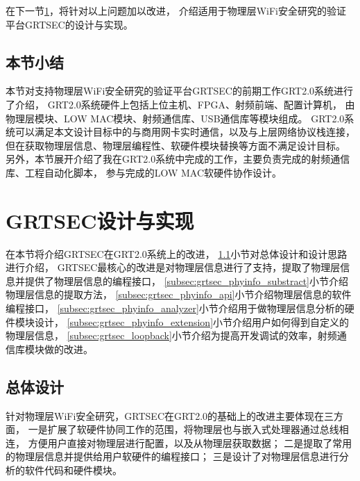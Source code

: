 		在下一节\ref{sec:grtsec_design}，将针对以上问题加以改进，
		介绍适用于物理层WiFi安全研究的验证平台GRTSEC的设计与实现。

		\subsection{本节小结}\label{subsec:grt2.0_summary}
		本节对支持物理层WiFi安全研究的验证平台GRTSEC的前期工作GRT2.0系统进行了介绍，
		GRT2.0系统硬件上包括上位主机、FPGA、射频前端、配置计算机，
		由物理层模块、LOW MAC模块、射频通信库、USB通信库等模块组成。
		GRT2.0系统可以满足本文设计目标中的与商用网卡实时通信，以及与上层网络协议栈连接，
		但在获取物理层信息、物理层编程性、软硬件模块替换等方面不满足设计目标。
		另外，本节展开介绍了我在GRT2.0系统中完成的工作，主要负责完成的射频通信库、工程自动化脚本，
		参与完成的LOW MAC软硬件协作设计。

	\section{GRTSEC设计与实现}\label{sec:grtsec_design}
		在本节将介绍GRTSEC在GRT2.0系统上的改进，
		\ref{subsec:grtsec_overview}小节对总体设计和设计思路进行介绍，
		GRTSEC最核心的改进是对物理层信息进行了支持，提取了物理层信息并提供了物理层信息的编程接口，
		\ref{subsec:grtsec_phyinfo_substract}小节介绍物理层信息的提取方法，
		\ref{subsec:grtsec_phyinfo_api}小节介绍物理层信息的软件编程接口，
		\ref{subsec:grtsec_phyinfo_analyzer}小节介绍用于做物理层信息分析的硬件模块设计，
		\ref{subsec:grtsec_phyinfo_extension}小节介绍用户如何得到自定义的物理层信息，
		\ref{subsec:grtsec_loopback}小节介绍为提高开发调试的效率，射频通信库模块做的改进。

		\subsection{总体设计}\label{subsec:grtsec_overview}
		针对物理层WiFi安全研究，GRTSEC在GRT2.0的基础上的改进主要体现在三方面，
		一是扩展了软硬件协同工作的范围，将物理层也与嵌入式处理器通过总线相连，
		方便用户直接对物理层进行配置，以及从物理层获取数据；
		二是提取了常用的物理层信息并提供给用户软硬件的编程接口；
		三是设计了对物理层信息进行分析的软件代码和硬件模块。

